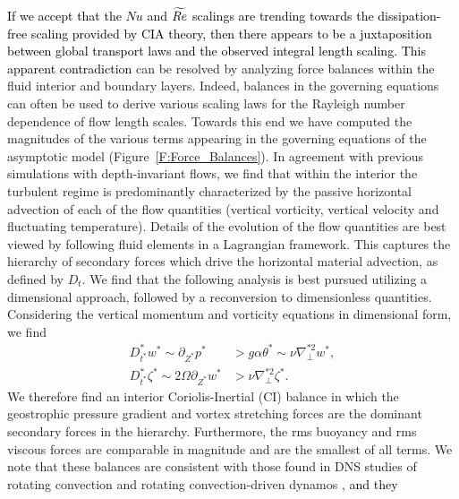 


\textcolor{black}{If we accept that the $Nu$ and $\widetilde{Re}$ scalings are trending towards the dissipation-free scaling provided by CIA theory, then there appears to be a juxtaposition between global transport laws and the observed integral length scaling. This apparent contradiction} can be resolved by analyzing force balances within the fluid interior and boundary layers. 
Indeed, balances in the governing equations can often be used to derive various scaling laws for the Rayleigh number dependence of flow length scales. 
Towards this end we have computed the magnitudes of the various terms appearing in the governing equations of the asymptotic model (Figure~\ref{F:Force_Balances}). 
In agreement with previous simulations with depth-invariant flows, we find that within the interior the turbulent regime is predominantly characterized by the passive horizontal advection of each of the flow quantities (vertical vorticity, vertical velocity and fluctuating temperature). 
Details of the evolution of the flow quantities are best viewed by following fluid elements in a Lagrangian framework. This captures the hierarchy of secondary forces which drive the horizontal material advection, as defined by $D_t$.
We find that the following analysis is best pursued utilizing a dimensional approach, followed by a reconversion to dimensionless quantities.
Considering the vertical momentum and vorticity equations in dimensional form, we find
\begin{align}
D^*_{t^*} w^* \sim \partial_{Z^*} p^* &>  g \alpha \theta^* \sim   \nu\nabla^{*2}_\perp w^*, 
\label{eq:wdim}\\
D^*_{t^*} \zeta^* \sim 2\Omega \partial_{Z^*} w^* & >  \nu\nabla^{*2}_\perp \zeta^*. 
\label{eq:zetadim}
\end{align}
We therefore find an interior Coriolis-Inertial (CI) balance in which the geostrophic pressure gradient and vortex stretching forces are the dominant secondary forces in the hierarchy. Furthermore, the rms buoyancy and rms viscous forces are comparable in magnitude and are the smallest of all terms. We note that these balances are consistent with those found in DNS studies of rotating convection \citep{aG21} and rotating convection-driven dynamos \citep{mY22}, \textcolor{black}{and they}
